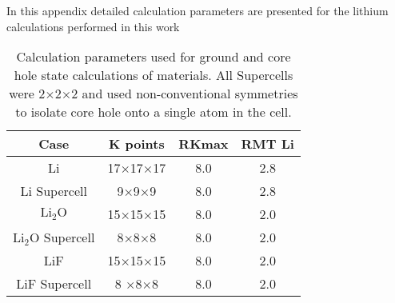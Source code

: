 In this appendix detailed calculation parameters are presented for the lithium calculations performed in this work

\begin{table}
	\centering
	\caption{Calculation parameters used for ground and core hole state calculations of materials. All Supercells were 2$\times$2$\times$2 and used non-conventional symmetries to isolate core hole onto a single atom in the cell. }
	\begin{tabular}{cccc}

		\hline
		Case	& K points	& RKmax	& RMT Li				\\
		\hline
		
		Li	&17$\times$17$\times$17	&8.0	&2.8	\\
		Li Supercell	&9$\times$9$\times$9	&8.0	&2.8	\\
		$\mathrm{Li_2O}$	&15$\times$15$\times$15	&8.0	&2.0	\\
		$\mathrm{Li_2O}$ Supercell	& 8$\times$8$\times$8	&8.0	&2.0	\\
		LiF	&15$\times$15$\times$15&8.0	&2.0	\\
		LiF Supercell	&8 $\times$8$\times$8	&8.0	&2.0\\
		
	\end{tabular} 
	

	\label{calc_params}
\end{table}

\newpage